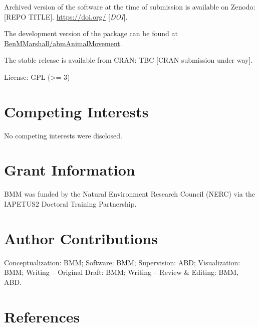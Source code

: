 \documentclass[10pt,a4paper]{article}
\begin{document}
Archived version of the software at the time of submission is available on Zenodo: {[}REPO TITLE{]}. \url{https://doi.org/} {[}\emph{DOI}{]}.

The development version of the package can be found at \href{https://github.com/BenMMarshall/abmAnimalMovement}{BenMMarshall/abmAnimalMovement}.

The stable release is available from CRAN: TBC {[}CRAN submission under way{]}.

License: GPL (\textgreater= 3)

\hypertarget{competing-interests}{%
\section{Competing Interests}\label{competing-interests}}

No competing interests were disclosed.

\hypertarget{grant-information}{%
\section{Grant Information}\label{grant-information}}

BMM was funded by the Natural Environment Research Council (NERC) via the IAPETUS2 Doctoral Training Partnership.

\hypertarget{author-contributions}{%
\section{Author Contributions}\label{author-contributions}}

Conceptualization: BMM;
Software: BMM;
Supervision: ABD;
Visualization: BMM;
Writing -- Original Draft: BMM;
Writing -- Review \& Editing: BMM, ABD.

\hypertarget{references}{%
\section*{References}\label{references}}
\end{document}
